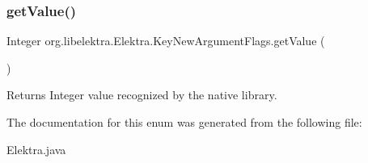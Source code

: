 \subsubsection{\texorpdfstring{get\+Value()}{getValue()}}
{\footnotesize\ttfamily Integer org.\+libelektra.\+Elektra.\+Key\+New\+Argument\+Flags.\+get\+Value (\begin{DoxyParamCaption}{ }\end{DoxyParamCaption})\hspace{0.3cm}{\ttfamily [inline]}}

\begin{DoxyReturn}{Returns}
Integer value recognized by the native library. 
\end{DoxyReturn}


The documentation for this enum was generated from the following file\+:\begin{DoxyCompactItemize}
\item 
Elektra.\+java\end{DoxyCompactItemize}
